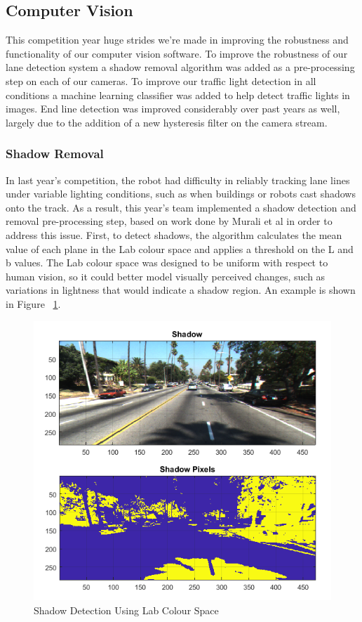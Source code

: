 \documentclass[11pt,journal]{IEEEtran}
\begin{document}
\subsection{Computer Vision}
This competition year huge strides we're made in improving the robustness and functionality of our computer vision software. To improve the robustness of our lane detection system a shadow removal algorithm was added as a pre-processing step on each of our cameras. To improve our traffic light detection in all conditions a machine learning classifier was added to help detect traffic lights in images. End line detection was improved considerably over past years as well, largely due to the addition of a new hysteresis filter on the camera stream. 

\subsubsection{Shadow Removal}
In last year's competition, the robot had difficulty in reliably tracking lane lines under variable lighting conditions, such as when buildings or robots cast shadows onto the track. As a result, this year's team implemented a shadow detection and removal pre-processing step, based on work done by Murali et al\cite{ShadRemoval} in order to address this issue.
First, to detect shadows, the algorithm calculates the mean value of each plane in the Lab colour space and applies a threshold on the L and b values. The Lab colour space was designed to be uniform with respect to human vision, so it could better model visually perceived changes, such as variations in lightness that would indicate a shadow region. An example is shown in Figure ~\ref{Shadow1}.
\begin{figure}[ht]
\centerline{\includegraphics[width=0.9\columnwidth]{X1.png}}
\caption{Shadow Detection Using Lab Colour Space}
\label{Shadow1}
\end{figure}
\end{document}
